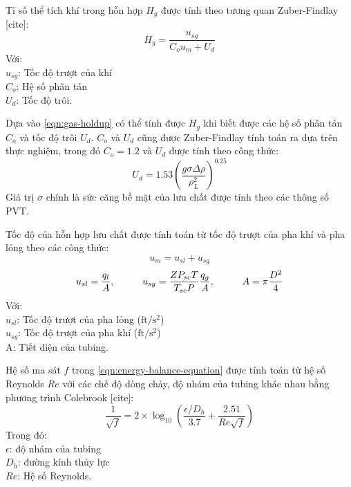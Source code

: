 \documentclass[12pt,a4paper]{report}
\begin{document}
Tỉ số thể tích khí trong hỗn hợp $H_g$ được tính theo tương quan Zuber-Findlay [cite]:
	\begin{equation}\label{eqn:gas-holdup}
		H_g = \dfrac{u_{sg}}{C_ou_m + U_d}
	\end{equation}
Với:\\
\hspace*{1cm}$u_{sg}$: Tốc độ trượt của khí\\
\hspace*{1cm}$C_o$: Hệ số phân tán\\
\hspace*{1cm}$U_d$: Tốc độ trôi.

Dựa vào \ref{eqn:gas-holdup} có thể tính được $H_g$ khi biết được các hệ số phân tán $C_o$ và tốc độ trôi $U_d$. $C_o$ và $U_d$ cũng được Zuber-Findlay tính toán ra dựa trên thực nghiệm, trong đó $C_o = 1.2$ và $U_d$ được tính theo công thức:
	\begin{equation}\label{eqn:drift-flux}
		U_d = 1.53  \left(\dfrac{g\sigma\Delta\rho}{\rho_L^2}\right)^{0.25}
	\end{equation}
Giá trị $\sigma$ chính là sức căng bề mặt của lưu chất được tính theo các thông số PVT.

Tốc độ của hỗn hợp lưu chất được tính toán từ tốc độ trượt của pha khí và pha lỏng theo các công thức:
	\begin{equation}\label{eqn:mixture-velocity}
		u_m = u_{sl} + u_{sg}
	\end{equation}
	\begin{equation}\label{eqn:usg-usl}
		u_{sl} = \dfrac{q_l}{A},\hspace*{1cm} u_{sg} = \dfrac{ZP_{sc}T}{T_{sc}P}\dfrac{q_g}{A},\hspace*{1cm} A = \pi\dfrac{D^2}{4}
	\end{equation}
Với:\\
\hspace*{1cm}$u_{sl}$: Tốc độ trượt của pha lỏng ($\text{ft}/\text{s}^2$)\\
\hspace*{1cm}$u_{sg}$: Tốc độ trượt của pha khí ($\text{ft}/\text{s}^2$)\\
\hspace*{1cm}A: Tiết diện của tubing.

Hệ số ma sát $f$ trong \ref{eqn:energy-balance-equation} được tính toán từ hệ số Reynolds $Re$ với các chế độ dòng chảy, độ nhám của tubing khác nhau bằng phương trình Colebrook [cite]:
	\begin{equation}\label{eqn:colebrook}
		\dfrac{1}{\sqrt{f}} = 2\times \log_{10}\left(\dfrac{\epsilon/D_h}{3.7} + \dfrac{2.51}{Re\sqrt{f}}\right)
	\end{equation}
Trong đó:\\
\hspace*{1cm}$\epsilon$: độ nhám của tubing\\
\hspace*{1cm}$D_h$: đường kính thủy lực\\
\hspace*{1cm}$Re$: Hệ số Reynolds.
\end{document}

